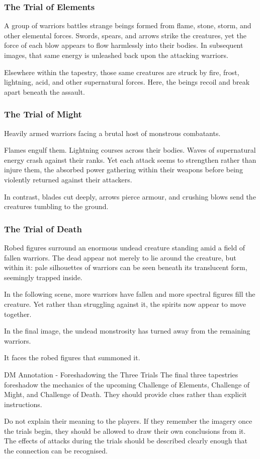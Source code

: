 \subsubsection*{The Trial of Elements}
{\entryfont A group of warriors battles strange beings formed from flame, stone, storm, and other elemental forces. Swords, spears, and arrows strike the creatures, yet the force of each blow appears to flow harmlessly into their bodies. In subsequent images, that same energy is unleashed back upon the attacking warriors.

Elsewhere within the tapestry, those same creatures are struck by fire, frost, lightning, acid, and other supernatural forces. Here, the beings recoil and break apart beneath the assault.}

\subsubsection*{The Trial of Might}
{\entryfont Heavily armed warriors facing a brutal host of monstrous combatants.

Flames engulf them. Lightning courses across their bodies. Waves of supernatural energy crash against their ranks. Yet each attack seems to strengthen rather than injure them, the absorbed power gathering within their weapons before being violently returned against their attackers.

In contrast, blades cut deeply, arrows pierce armour, and crushing blows send the creatures tumbling to the ground.}

\subsubsection*{The Trial of Death}
{\entryfont Robed figures surround an enormous undead creature standing amid a field of fallen warriors. The dead appear not merely to lie around the creature, but within it: pale silhouettes of warriors can be seen beneath its translucent form, seemingly trapped inside.

In the following scene, more warriors have fallen and more spectral figures fill the creature. Yet rather than struggling against it, the spirits now appear to move together.

In the final image, the undead monstrosity has turned away from the remaining warriors.

It faces the robed figures that summoned it.}

\begingroup
	\DndSetThemeColor[PhbTan]
	\begin{DndComment}{DM Annotation - Foreshadowing the Three Trials}
		The final three tapestries foreshadow the mechanics of the upcoming Challenge of Elements, Challenge of Might, and Challenge of Death. They should provide clues rather than explicit instructions.

Do not explain their meaning to the players. If they remember the imagery once the trials begin, they should be allowed to draw their own conclusions from it. The effects of attacks during the trials should be described clearly enough that the connection can be recognised.
	\end{DndComment}
\endgroup

